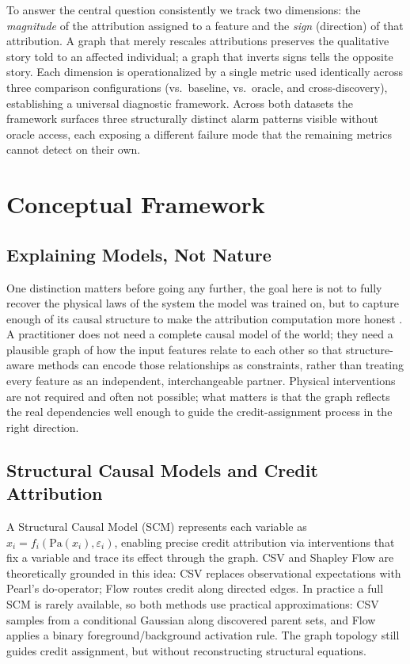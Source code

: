 \documentclass[12pt,letterpaper,twocolumn]{article}
\begin{document}
To answer the central question consistently we track two dimensions: the \emph{magnitude}
of the attribution assigned to a feature and the \emph{sign} (direction) of that
attribution. A graph that merely rescales attributions preserves the qualitative story
told to an affected individual; a graph that inverts signs tells the opposite story.
Each dimension is operationalized by a single metric used identically across three
comparison configurations (vs.\ baseline, vs.\ oracle, and cross-discovery), establishing
a universal diagnostic framework. Across both datasets the framework surfaces three
structurally distinct alarm patterns visible without oracle access, each exposing a
different failure mode that the remaining metrics cannot detect on their own.

\section{Conceptual Framework}
\label{sec:framework}

\subsection{Explaining Models, Not Nature}

One distinction matters before going any further, the goal here is not to fully recover the
physical laws of the system the model was trained on, but to capture enough of its
causal structure to make the attribution computation more honest \citep{Baron2023}.
A practitioner does not need a complete causal model of the world; they need a
plausible graph of how the input features relate to each other so that structure-aware
methods can encode those relationships as constraints, rather than treating every feature
as an independent, interchangeable partner. Physical interventions are not required and
often not possible; what matters is that the graph reflects the real dependencies well
enough to guide the credit-assignment process in the right direction.

\subsection{Structural Causal Models and Credit Attribution}

A Structural Causal Model (SCM) \citep{Pearl2009} represents each variable as
$x_i = f_i(\mathrm{Pa}(x_i), \varepsilon_i)$, enabling precise credit attribution via
interventions that fix a variable and trace its effect through the graph. CSV and
Shapley Flow are theoretically grounded in this idea: CSV replaces observational
expectations with Pearl's do-operator; Flow routes credit along directed edges. In
practice a full SCM is rarely available, so both methods use practical approximations:
CSV samples from a conditional Gaussian along discovered parent sets, and Flow applies
a binary foreground/background activation rule. The graph topology still guides credit
assignment, but without reconstructing structural equations.
\end{document}
